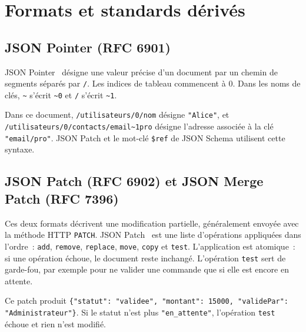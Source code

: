 \documentclass[12pt,a4paper]{article}
\newcommand{\exemple}[3][]{%
  \par\addvspace{6pt}\noindent\begin{minipage}{\linewidth}%
  \end{minipage}\par\addvspace{6pt}}
\begin{document}
\section{Formats et standards dérivés}
\label{sec:derives}

\subsection{JSON Pointer (RFC 6901)}
JSON Pointer~\cite{bryan2013rfc6901} désigne une valeur précise d'un document par un chemin de segments séparés par \texttt{/}. Les indices de tableau commencent à 0. Dans les noms de clés, \texttt{\textasciitilde} s'écrit \texttt{\textasciitilde 0} et \texttt{/} s'écrit \texttt{\textasciitilde 1}.

\exemple[language=json]{json/contacts.json}{Document utilisé pour les exemples de JSON Pointer}

Dans ce document, \texttt{/utilisateurs/0/nom} désigne \texttt{"Alice"}, et \nolinkurl{/utilisateurs/0/contacts/email~1pro} désigne l'adresse associée à la clé \texttt{"email/pro"}. JSON Patch et le mot-clé \texttt{\$ref} de JSON Schema utilisent cette syntaxe.

\subsection{JSON Patch (RFC 6902) et JSON Merge Patch (RFC 7396)}
Ces deux formats décrivent une modification partielle, généralement envoyée avec la méthode HTTP \texttt{PATCH}. JSON Patch~\cite{bryan2013rfc6902} est une liste d'opérations appliquées dans l'ordre~: \texttt{add}, \texttt{remove}, \texttt{replace}, \texttt{move}, \texttt{copy} et \texttt{test}. L'application est atomique~: si une opération échoue, le document reste inchangé. L'opération \texttt{test} sert de garde-fou, par exemple pour ne valider une commande que si elle est encore en attente.

\exemple[language=json]{json/commande.json}{Document de départ}

\exemple[language=json]{json/commande.patch.json}{JSON Patch appliqué au document}

Ce patch produit \texttt{\{"statut": "validee", "montant": 15000, "validePar": "Administrateur"\}}. Si le statut n'est plus \texttt{"en\_attente"}, l'opération \texttt{test} échoue et rien n'est modifié.
\end{document}
